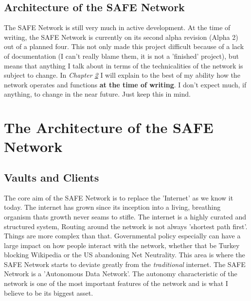 \documentclass{l4proj}
\begin{document}
\section{Architecture of the SAFE Network}

The SAFE Network is still very much in active development. At the time of writing, the SAFE Network is currently on its second alpha revision (Alpha 2) out of a planned four. This not only made this project difficult because of a lack of documentation (I can't really blame them, it is not a 'finished' project), but means that anything I talk about in terms of the technicalities of the network is subject to change. In \textit{Chapter \ref{ch:architecture}} I will explain to the best of my ability how the network operates and functions \textbf{at the time of writing}. I don't expect much, if anything, to change in the near future. Just keep this in mind.

\chapter{The Architecture of the SAFE Network}
\label{ch:architecture}

\section{Vaults and Clients}

The core aim of the SAFE Network is to replace the 'Internet' as we know it today. The internet has grown since its inception into a living, breathing organism thats growth never seams to stifle. The internet is a highly curated and structured system, Routing around the network is not always 'shortest path first'. Things are more complex than that. Governmental policy especially can have a large impact on how people interact with the network, whether that be Turkey blocking Wikipedia or the US abandoning Net Neutrality. This area is where the SAFE Network starts to deviate greatly from the \textit{traditional} internet. The SAFE Network is a 'Autonomous Data Network'. The autonomy characteristic of the network is one of the most important features of the network and is what I believe to be its biggest asset.
\end{document}
